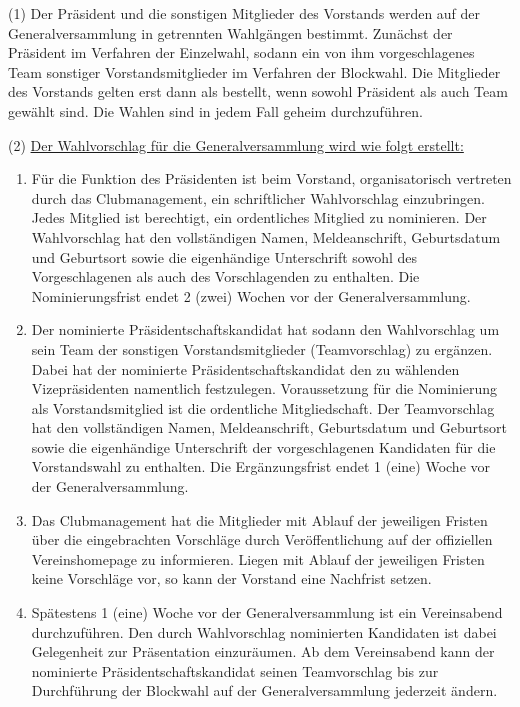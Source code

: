 \documentclass[11pt,a4paper]{article}
\begin{document}
(1)
Der Präsident und die sonstigen Mitglieder des Vorstands werden auf der Generalversammlung in getrennten Wahlgängen bestimmt.
Zunächst der Präsident im Verfahren der Einzelwahl, sodann ein von ihm vorgeschlagenes Team sonstiger Vorstandsmitglieder im Verfahren der Blockwahl.
Die Mitglieder des Vorstands gelten erst dann als bestellt, wenn sowohl Präsident als auch Team gewählt sind.
Die Wahlen sind in jedem Fall geheim durchzuführen.

(2)
\underline{Der Wahlvorschlag für die Generalversammlung wird wie folgt erstellt:}

\begin{enumerate}[label=\alph*)]
\item
Für die Funktion des Präsidenten ist beim Vorstand, organisatorisch vertreten durch das Clubmanagement, ein schriftlicher Wahlvorschlag einzubringen.
Jedes Mitglied ist berechtigt, ein ordentliches Mitglied zu nominieren.
Der Wahlvorschlag hat den vollständigen Namen, Meldeanschrift, Geburtsdatum und Geburtsort sowie die eigenhändige Unterschrift sowohl des Vorgeschlagenen als auch des Vorschlagenden zu enthalten.
Die Nominierungsfrist endet 2 (zwei) Wochen vor der Generalversammlung.
\item
Der nominierte Präsidentschaftskandidat hat sodann den Wahlvorschlag um sein Team der sonstigen Vorstandsmitglieder (Teamvorschlag) zu ergänzen.
Dabei hat der nominierte Präsidentschaftskandidat den zu wählenden Vizepräsidenten namentlich festzulegen.
Voraussetzung für die Nominierung als Vorstandsmitglied ist die ordentliche Mitgliedschaft.
Der Teamvorschlag hat den vollständigen Namen, Meldeanschrift, Geburtsdatum und Geburtsort sowie die eigenhändige Unterschrift der vorgeschlagenen Kandidaten für die Vorstandswahl zu enthalten.
Die Ergänzungsfrist endet 1 (eine) Woche vor der Generalversammlung.
\item
Das Clubmanagement hat die Mitglieder mit Ablauf der jeweiligen Fristen über die eingebrachten Vorschläge durch Veröffentlichung auf der offiziellen Vereinshomepage zu informieren.
Liegen mit Ablauf der jeweiligen Fristen keine Vorschläge vor, so kann der Vorstand eine Nachfrist setzen.
\item
Spätestens 1 (eine) Woche vor der Generalversammlung ist ein Vereinsabend durchzuführen.
Den durch Wahlvorschlag nominierten Kandidaten ist dabei Gelegenheit zur Präsentation einzuräumen.
Ab dem Vereinsabend kann der nominierte Präsidentschaftskandidat seinen Teamvorschlag bis zur Durchführung der Blockwahl auf der Generalversammlung jederzeit ändern.
\end{enumerate}
\end{document}
